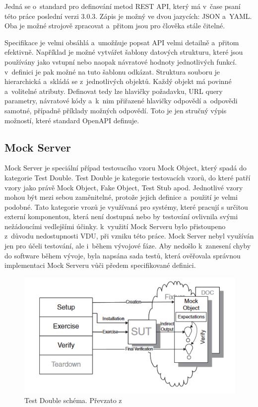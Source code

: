 Jedná se o standard pro definování metod REST API, který má v čase psaní této práce poslední verzi 3.0.3. Zápis je možný ve dvou jazycích: JSON a YAML. Oba 
je možné strojově zpracovat a přitom jsou pro člověka stále čitelné. 

Specifikace je velmi obsáhlá a umožňuje popsat API velmi detailně a přitom efektivně. Například je možné vytvářet šablony datových strukturu, které jsou používány jako
vstupní nebo naopak návratové hodnoty jednotlivých funkcí. v definici je pak možné na tuto šablonu odkázat. Struktura souboru je hierarchická a skládá se z jednotlivých objektů.
Každý objekt má povinné a volitelné atributy. Definovat tedy lze hlavičky požadavku, URL query parametry, návratové kódy a k nim přiřazené hlavičky odpovědí a odpovědi samotné,
případně příklady možných odpovědí. Toto je jen stručný výpis možností, které standard OpenAPI definuje.\cite{OpenAPI}

\subsection{Mock Server}

Mock Server je speciální případ testovacího vzoru Mock Object, který spadá do kategorie Test Double. Test Double je kategorie testovacích vzorů, do které patří
vzory jako právě Mock Object, Fake Object, Test Stub apod. Jednotlivé vzory mohou být mezi sebou zaměnitelné, protože jejich definice a použití je velmi podobné. 
Tato kategorie vrozů je využívaná pro systémy, které pracují s určitou externí komponentou, která není dostupná nebo by testování ovlivnila svými nežádoucími
vedlejšími účinky.\cite[522--524]{UnitPatternsTest} k využití Mock Serveru bylo přistoupeno z důvodu nedostupnosti VDU, při vzniku této práce. Mock Server nebyl využíván 
jen pro účeli testování, ale i během vývojové fáze. Aby nedošlo k zanesení chyby do software během vývoje, byla napsána sada testů, která ověřovala správnou
implementaci Mock Serveru vůči předem specifikované definici.

\begin{figure}[h]
    \centering
    \includegraphics[width=0.67\linewidth]{other-fig/mock_object.png}
    \caption{Test Double schéma. Převzato z \cite[544]{UnitPatternsTest}}
\end{figure}

